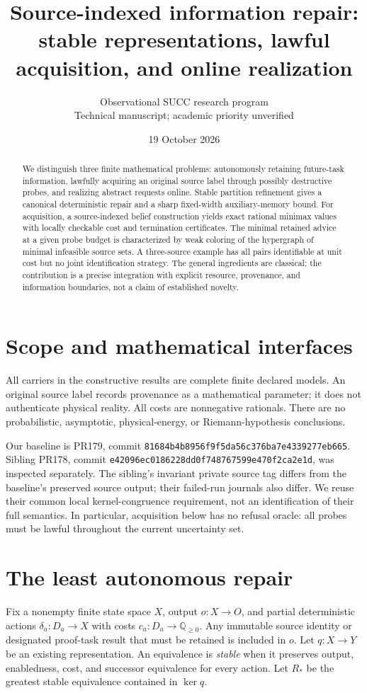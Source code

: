 \documentclass[11pt]{article}
\title{Source-indexed information repair:\\stable representations, lawful acquisition, and online realization}
\author{Observational SUCC research program\\Technical manuscript; academic priority unverified}
\date{19 October 2026}
\theoremstyle{definition}
\begin{document}
\maketitle
\begin{abstract}
We distinguish three finite mathematical problems: autonomously retaining
future-task information, lawfully acquiring an original source label through
possibly destructive probes, and realizing abstract requests online. Stable
partition refinement gives a canonical deterministic repair and a sharp
fixed-width auxiliary-memory bound. For acquisition, a source-indexed belief
construction yields exact rational minimax values with locally checkable
cost and termination certificates. The minimal retained advice at a given
probe budget is characterized by weak coloring of the hypergraph of minimal
infeasible source sets. A three-source example has all pairs identifiable at
unit cost but no joint identification strategy. The general ingredients are
classical; the contribution is a precise integration with explicit resource,
provenance, and information boundaries, not a claim of established novelty.
\end{abstract}

\section{Scope and mathematical interfaces}
All carriers in the constructive results are complete finite declared models.
An original source label records provenance as a mathematical parameter; it
does not authenticate physical reality. All costs are nonnegative rationals.
There are no probabilistic, asymptotic, physical-energy, or Riemann-hypothesis
conclusions.

Our baseline is PR179, commit
\texttt{81684b4b8956f9f5da56c376ba7e4339277eb665}.
Sibling PR178, commit
\texttt{e42096ec0186228dd0f748767599e470f2ca2e1d}, was inspected separately.
The sibling's invariant private source tag differs from the baseline's
preserved source output; their failed-run journals also differ. We reuse
their common local kernel-congruence requirement, not an identification of
their full semantics. In particular, acquisition below has no refusal oracle:
all probes must be lawful throughout the current uncertainty set.

\section{The least autonomous repair}
Fix a nonempty finite state space $X$, output $o:X\to O$, and partial
deterministic actions $\delta_a:D_a\to X$ with costs
$c_a:D_a\to\mathbb Q_{\ge0}$. Any immutable source identity or designated
proof-task result that must be retained is included in $o$. Let $q:X\to Y$
be an existing representation. An equivalence is \emph{stable} when it
preserves output, enabledness, cost, and successor equivalence for every
action. Let $R_*$ be the greatest stable equivalence contained in $\ker q$.
\end{document}
